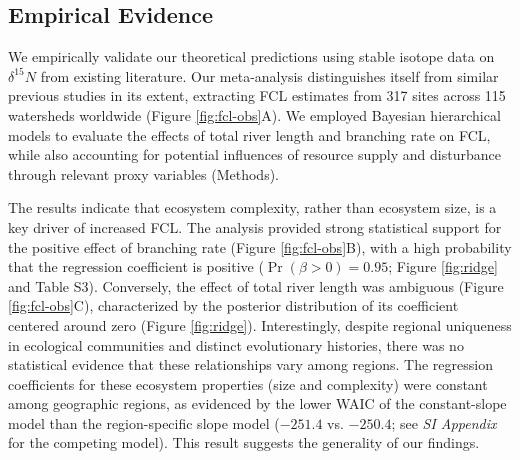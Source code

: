 \documentclass[11pt, class=article, crop=false]{standalone}
\begin{document}
\subsection{Empirical Evidence}

We empirically validate our theoretical predictions using stable isotope data on $\delta^{15}N$ from existing literature.
Our meta-analysis distinguishes itself from similar previous studies in its extent, extracting FCL estimates from 317 sites across 115 watersheds worldwide (Figure \ref{fig:fcl-obs}A).
We employed Bayesian hierarchical models to evaluate the effects of total river length and branching rate on FCL, while also accounting for potential influences of resource supply and disturbance through relevant proxy variables (Methods).

The results indicate that ecosystem complexity, rather than ecosystem size, is a key driver of increased FCL.
The analysis provided strong statistical support for the positive effect of branching rate (Figure \ref{fig:fcl-obs}B), with a high probability that the regression coefficient is positive ($\Pr(\beta > 0) = 0.95$; Figure \ref{fig:ridge} and Table S3).
Conversely, the effect of total river length was ambiguous (Figure \ref{fig:fcl-obs}C), characterized by the posterior distribution of its coefficient centered around zero (Figure \ref{fig:ridge}).
Interestingly, despite regional uniqueness in ecological communities and distinct evolutionary histories, there was no statistical evidence that these relationships vary among regions.
The regression coefficients for these ecosystem properties (size and complexity) were constant among geographic regions, as evidenced by the lower WAIC \citep{watanabe_asymptotic_2010} of the constant-slope model than the region-specific slope model ($-251.4$ vs. $-250.4$; see \textit{SI Appendix} for the competing model).
This result suggests the generality of our findings. 
\end{document}
